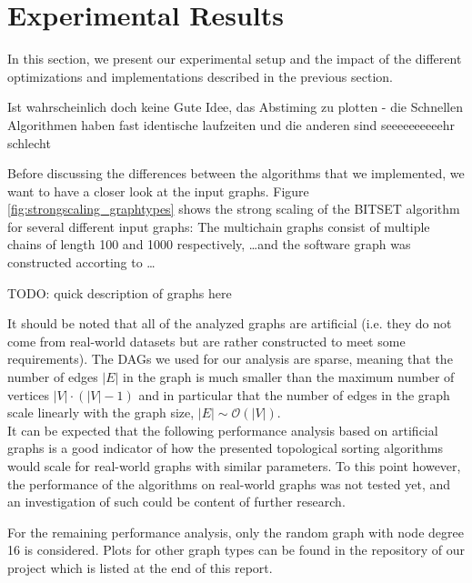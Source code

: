 \section{Experimental Results}\label{sec:exp}
%
In this section, we present our experimental setup and the impact of the different optimizations and implementations described in the previous section.
\par\medskip
%
\begin{invisible}
	Ist wahrscheinlich doch keine Gute Idee, das Abstiming zu plotten - die Schnellen Algorithmen haben fast identische laufzeiten und die anderen sind seeeeeeeeeehr schlecht
\end{invisible}
%
 Before discussing the differences between the algorithms that we implemented, we want to have a closer look at the input graphs.
Figure \ref{fig:strongscaling_graphtypes} shows the strong scaling of the BITSET algorithm for several different input graphs:
The multichain graphs consist of multiple chains of length 100 and 1000 respectively, \ldots and the software graph was constructed accorting to \ldots \\
\begin{invisible}
	{\Large TODO:} quick description of graphs here
\end{invisible}
It should be noted that all of the analyzed graphs are artificial (i.e. they do not come from real-world datasets but are rather constructed to meet some requirements).
The DAGs we used for our analysis are sparse, meaning that the number of edges $|E|$ in the graph is much smaller than the maximum number of vertices $|V|\cdot(|V|-1)$ and in particular that the number of edges in the graph scale linearly with the graph size, $|E| \sim \mathcal{O} ( |V| )$. \\
It can be expected that the following performance analysis based on artificial graphs is a good indicator of how the presented topological sorting algorithms would scale for real-world graphs with similar parameters.
To this point however, the performance of the algorithms on real-world graphs was not tested yet, and an investigation of such could be content of further research.
\par\medskip
%
For the remaining performance analysis, only the random graph with node degree 16 is considered.
Plots for other graph types can be found in the repository of our project which is listed at the end of this report.

 
